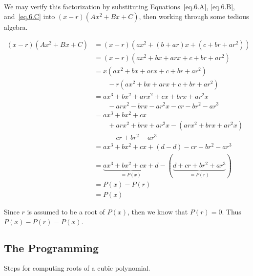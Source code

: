 We may verify this factorization by substituting Equations~\eqref{eq.6.A}, \eqref{eq.6.B}, and~\eqref{eq.6.C}
into $(x-r) (A x^2 + B x + C)$, then working through some tedious algebra.

\begin{align*}
  (x-r) (A x^2 + B x + C)
  &= (x-r) (a x^2 + (b + a r) x + (c + b r + a r^2))\\
  &= (x-r) (a x^2 + b x + a r x + c + b r + a r^2)\\
  &= x(a x^2 + b x + a r x + c + b r + a r^2) \\
  &\quad\quad - r (a x^2 + b x + a r x + c + b r + a r^2)\\
  &= a x^3 + b x^2 + a r x^2 + cx + b r x + a r^2 x\\
  &\quad\quad - a r x^2 - b r x - a r^2 x - c r - b r^2 - a r^3\\
  &= a x^3 + b x^2 + cx  \\
  &\quad\quad + a r x^2 + b r x + a r^2 x - ( a r x^2 + b r x + a r^2 x) \\
  &\quad\quad  - c r + b r^2 - a r^3\\
  &= a x^3 + b x^2 + cx + ( d - d) - c r - b r^2 - a r^3\\
  &= \underbrace{a x^3 + b x^2 + cx +  d}_{=P(x)} - (\underbrace{d + c r + b r^2 + a r^3}_{=P(r)})\\
  &= P(x) - P(r)\\
  &= P(x) 
\end{align*}

Since $r$ is assumed to be a root of $P(x)$, then we know that $P(r)=0$.  Thus $P(x)-P(r)=P(x)$.

\subsection{The Programming}

Steps for computing roots of a cubic polynomial.

